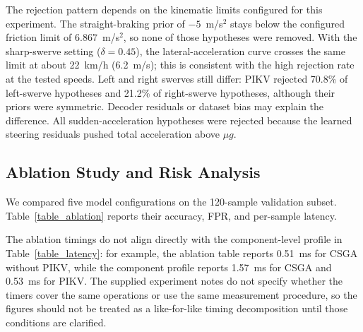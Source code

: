 The rejection pattern depends on the kinematic limits configured for this experiment. The straight-braking prior of $-5$~m/s$^2$ stays below the configured friction limit of $6.867$~m/s$^2$, so none of those hypotheses were removed. With the sharp-swerve setting ($\delta = 0.45$), the lateral-acceleration curve crosses the same limit at about 22~km/h (6.2~m/s); this is consistent with the high rejection rate at the tested speeds. Left and right swerves still differ: PIKV rejected 70.8\% of left-swerve hypotheses and 21.2\% of right-swerve hypotheses, although their priors were symmetric. Decoder residuals or dataset bias may explain the difference. All sudden-acceleration hypotheses were rejected because the learned steering residuals pushed total acceleration above $\mu g$.

\subsection{Ablation Study and Risk Analysis}
We compared five model configurations on the 120-sample validation subset. Table~\ref{table_ablation} reports their accuracy, FPR, and per-sample latency.

\begin{table}[H]
\caption{Ablation study on the 120-sample validation split (anomaly threshold CRT $> 0.4$).}
\centering
\label{table_ablation}
\end{table}

The ablation timings do not align directly with the component-level profile in Table~\ref{table_latency}: for example, the ablation table reports 0.51~ms for CSGA without PIKV, while the component profile reports 1.57~ms for CSGA and 0.53~ms for PIKV. The supplied experiment notes do not specify whether the timers cover the same operations or use the same measurement procedure, so the figures should not be treated as a like-for-like timing decomposition until those conditions are clarified.

